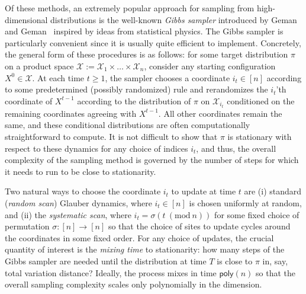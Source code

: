\documentclass[11pt]{article}
\newcommand{\Mod}[1]{\ (\mathrm{mod}\ #1)}
\begin{document}
Of these methods, an extremely popular approach for sampling from high-dimensional distributions is the well-known \emph{Gibbs sampler} introduced by Geman and Geman~\cite{geman1984stochastic} inspired by ideas from statistical physics. The Gibbs sampler is particularly convenient since it is usually quite efficient to implement. %
Concretely, the general form of these procedures is as follows: for some target distribution $\pi$ on a product space $\mathcal{X}:=\mathcal{X}_1\times\ldots\times \mathcal{X}_n$, consider any starting configuration $X^0\in \mathcal{X}$. At each time $t\geq 1$, the sampler chooses a coordinate $i_t\in [n]$ according to some predetermined (possibly randomized) rule and rerandomizes the $i_t$'th coordinate of $X^{t-1}$ according to the distribution of $\pi$ on $\mathcal{X}_{i_t}$ conditioned on the remaining coordinates agreeing with $X^{t-1}$. All other coordinates remain the same, and these conditional distributions are often computationally straightforward to compute. It is not difficult to show that $\pi$ is stationary with respect to these dynamics for any choice of indices $i_t$, and thus, the overall complexity of the sampling method is governed by the number of steps for which it needs to run to be close to stationarity.

Two natural ways to choose the coordinate $i_t$ to update at time $t$ are (i) standard (\emph{random scan}) Glauber dynamics, where $i_t\in [n]$ is chosen uniformly at random, and (ii) the \emph{systematic scan}, where $i_t = \sigma(t\Mod n)$ for some fixed choice of permutation $\sigma:[n]\to [n]$ so that the choice of sites to update cycles around the coordinates in some fixed order. For any choice of updates, the crucial quantity of interest is the \emph{mixing time} to stationarity: how many steps of the Gibbs sampler are needed until the distribution at time $T$ is close to $\pi$ in, say, total variation distance? Ideally, the process mixes in time $\mathsf{poly}(n)$ so that the overall sampling complexity scales only polynomially in the dimension.
\end{document}
